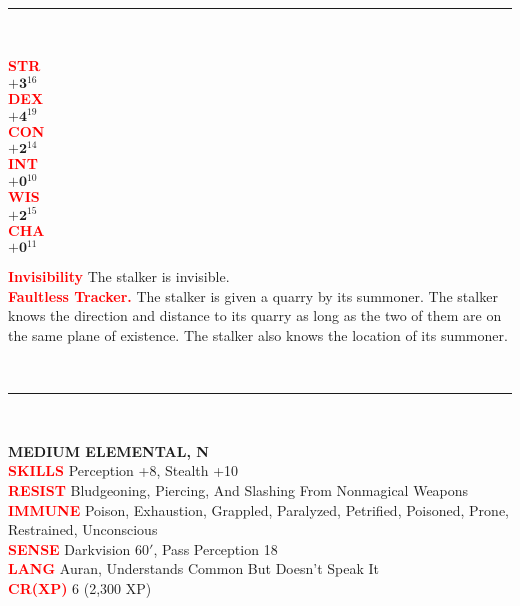 \documentclass{article}
\begin{document}
\begin{minipage}[t][10in][t]{0.4\textwidth}
\begin{minipage}[t]{0.7\textwidth}
	\end{minipage}
	\vspace{0.025in}\\
	\rule{\textwidth}{1pt}\\
	\vspace{0.025in}
	\begin{minipage}[t]{0.2\textwidth}
		{\large
		\textcolor{red}{\textbf{STR}}\\[0.1em]
		$\mathbf{+3}$\quad$^{16}$ \\[0.1em]
		\textcolor{red}{\textbf{DEX}}\\[0.1em]
		$\mathbf{+4}$\quad$^{19}$ \\[0.1em]
		\textcolor{red}{\textbf{CON}}\\[0.1em]
		$\mathbf{+2}$\quad$^{14}$ \\[0.1em]
		\textcolor{red}{\textbf{INT}}\\[0.1em]
		$\mathbf{+0}$\quad$^{10}$ \\[0.1em]
		\textcolor{red}{\textbf{WIS}}\\[0.1em]
		$\mathbf{+2}$\quad$^{15}$ \\[0.1em]
		\textcolor{red}{\textbf{CHA}}\\[0.1em]
		$\mathbf{+0}$\quad$^{11}$ \\[0.1em]
		}
	\end{minipage}
	\hspace{-0.1in}
	\vline
	\hspace{0.1in}
	\begin{minipage}[t]{0.7\textwidth}
		\textcolor{red}{\textbf{Invisibility}} The stalker is invisible. \\[0.2em]
		\textcolor{red}{\textbf{Faultless Tracker.}} The stalker is given a quarry by its summoner. The stalker knows the direction and distance to its quarry as long as the two of them are on the same plane of existence. The stalker also knows the location of its summoner.
	\end{minipage}
	\vspace{0.025in}\\
	\rule{\textwidth}{1pt}\\
	\vspace{-0.08in}
	\begin{flushleft}
		{\large\textbf{MEDIUM ELEMENTAL, N}}\\
		\textcolor{red}{\textbf{SKILLS}} Perception +8, Stealth +10 \\
		\textcolor{red}{\textbf{RESIST}} Bludgeoning, Piercing, And Slashing From Nonmagical Weapons\\
		\textcolor{red}{\textbf{IMMUNE}} Poison, Exhaustion, Grappled, Paralyzed, Petrified, Poisoned, Prone, Restrained, Unconscious\\
		\textcolor{red}{\textbf{SENSE}} Darkvision $60'$, Pass Perception 18\\
		\textcolor{red}{\textbf{LANG}} Auran, Understands Common But Doesn't Speak It\\
		\textcolor{red}{\textbf{CR(XP)}}  6 (2,300 XP)\\
	\end{flushleft}
	
	
	
	
\end{minipage}
\end{document}
